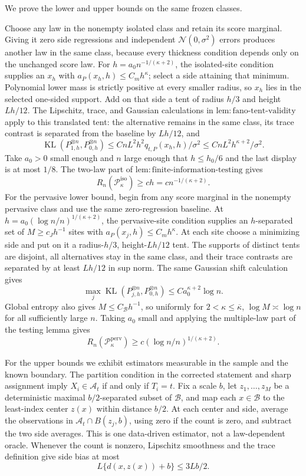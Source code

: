 We prove the lower and upper bounds on the same frozen classes.

Choose any law in the nonempty isolated class and retain its score marginal. Giving it zero side regressions and independent \(\mathcal N(0,\sigma^2)\) errors produces another law in the same class, because every thickness condition depends only on the unchanged score law. For \(h=a_0n^{-1/(\kappa+2)}\), the isolated-site condition supplies an \(x_h\) with \(a_P(x_h,h)\le C_mh^\kappa\); select a side attaining that minimum. Polynomial lower mass is strictly positive at every smaller radius, so \(x_h\) lies in the selected one-sided support. Add on that side a tent of radius \(h/3\) and height \(Lh/12\). The Lipschitz, trace, and Gaussian calculations in \(\mathrm{lem:fano\text{-}tent\text{-}validity}\) apply to this translated tent: the alternative remains in the same class, its trace contrast is separated from the baseline by \(Lh/12\), and
\[
 \operatorname{KL}(P_{1,h}^{\otimes n},P_{0,h}^{\otimes n})
 \le CnL^2h^2q_{t,P}(x_h,h)/\sigma^2
 \le CnL^2h^{\kappa+2}/\sigma^2.
\]
Take \(a_0>0\) small enough and \(n\) large enough that \(h\le h_0/6\) and the last display is at most \(1/8\). The two-law part of \(\mathrm{lem:finite\text{-}information\text{-}testing}\) gives
\[
 R_n(\mathcal P_\kappa^{\mathrm{iso}})\ge c h
 =c n^{-1/(\kappa+2)}.
\]
For the pervasive lower bound, begin from any score marginal in the nonempty pervasive class and use the same zero-regression baseline. At \(h=a_0(\log n/n)^{1/(\kappa+2)}\), the pervasive-site condition supplies an \(h\)-separated set of \(M\ge c_Jh^{-1}\) sites with \(a_P(x_j,h)\le C_mh^\kappa\). At each site choose a minimizing side and put on it a radius-\(h/3\), height-\(Lh/12\) tent. The supports of distinct tents are disjoint, all alternatives stay in the same class, and their trace contrasts are separated by at least \(Lh/12\) in sup norm. The same Gaussian shift calculation gives
\[
 \max_j\operatorname{KL}(P_{j,h}^{\otimes n},P_{0,h}^{\otimes n})
 \le C a_0^{\kappa+2}\log n.
\]
Global entropy also gives \(M\le C_\mathcal B h^{-1}\), so uniformly for \(2<\kappa\le\overline\kappa\), \(\log M\asymp\log n\) for all sufficiently large \(n\). Taking \(a_0\) small and applying the multiple-law part of the testing lemma gives
\[
 R_n(\mathcal P_\kappa^{\mathrm{perv}})\ge c(\log n/n)^{1/(\kappa+2)}.
\]

For the upper bounds we exhibit estimators measurable in the sample and the known boundary. The partition condition in the corrected statement and sharp assignment imply \(X_i\in\mathcal A_t\) if and only if \(T_i=t\). Fix a scale \(b\), let \(z_1,\ldots,z_M\) be a deterministic maximal \(b/2\)-separated subset of \(\mathcal B\), and map each \(x\in\mathcal B\) to the least-index center \(z(x)\) within distance \(b/2\). At each center and side, average the observations in \(\mathcal A_t\cap B(z_j,b)\), using zero if the count is zero, and subtract the two side averages. This is one data-driven estimator, not a law-dependent oracle. Whenever the count is nonzero, Lipschitz smoothness and the trace definition give side bias at most
\[
 L\{d(x,z(x))+b\}\le 3Lb/2.
\]

